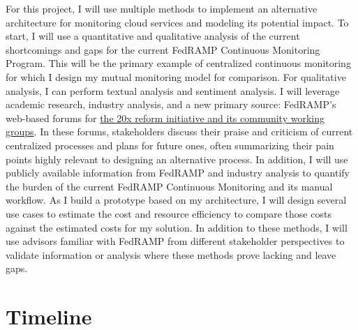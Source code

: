 \documentclass{jdf}
\begin{document}
For this project, I will use multiple methods to implement an alternative architecture for monitoring cloud services and modeling its potential impact. To start, I will use a quantitative and qualitative analysis of the current shortcomings and gaps for the current FedRAMP Continuous Monitoring Program. This will be the primary example of centralized continuous monitoring for which I design my mutual monitoring model for comparison. For qualitative analysis, I can perform textual analysis and sentiment analysis. I will leverage academic research, industry analysis, and a new primary source: FedRAMP's web-based forums for \hyperlink{https://www.fedramp.gov/20x/working-groups/}{the 20x reform initiative and its community working groups}. In these forums, stakeholders discuss their praise and criticism of current centralized processes and plans for future ones, often summarizing their pain points highly relevant to designing an alternative process. In addition, I will use publicly available information from FedRAMP and industry analysis to quantify the burden of the current FedRAMP Continuous Monitoring and its manual workflow. As I build a prototype based on my architecture, I will design several use cases to estimate the cost and resource efficiency to compare those costs against the estimated costs for my solution. In addition to these methods, I will use advisors familiar with FedRAMP from different stakeholder perspectives to validate information or analysis where these methods prove lacking and leave gaps.

\section*{Timeline}
\end{document}
